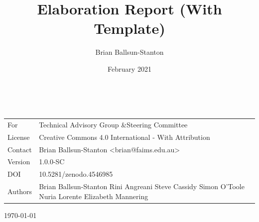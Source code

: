 \documentclass[a4paper,headings=small fontsize=10pt]{scrreprt}
\title{Elaboration Report (With Template)}
\author{Brian Ballsun-Stanton}
\date{February 2021}
\begin{document}
\begin{titlepage}
~
\vspace{-1cm}%




\parbox{.6\textwidth}{
\begin{flushleft}
\selectfont
\fontsize{30pt}{36pt}%
\bfseries
\selectfont%
\textcolor{faimsblue}{%
}
\end{flushleft}
}

\vspace{-5mm}

\parbox{.7\textwidth}{
\begin{flushleft}

\fontsize{18pt}{21pt}%
%
\selectfont%
\textcolor{faimsblue}{%
}


\end{flushleft}

{\renewcommand{\arraystretch}{1.5}

\vspace{1cm}
%
\selectfont%
\begin{tabular}{@{}l p{}}
\textcolor{faimsblue}{
For} & Technical Advisory Group \&\newline Steering Committee \\
\textcolor{faimsblue}{License} & Creative Commons 4.0 International - With Attribution \\
\textcolor{faimsblue}{Contact} & Brian Ballsun-Stanton \newline <brian@faims.edu.au>
\\
\textcolor{faimsblue}{Version} & 1.0.0-SC
\\
\textcolor{faimsblue}{DOI} & 10.5281/zenodo.4546985
\\
\textcolor{faimsblue}{Authors} & Brian Ballsun-Stanton \newline
Rini Angreani \newline
Steve Cassidy \newline
Simon O’Toole \newline
Nuria Lorente \newline
Elizabeth Mannering


\end{tabular}

}}

\vfill
\fontsize{16pt}{19pt}%
%
\selectfont%
\textcolor{faimsblue}{%
\today
}


\end{titlepage}
\end{document}
